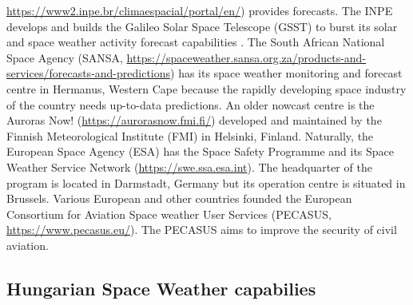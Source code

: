 \documentclass[sn-aps]{sn-jnl}%
\begin{document}
\url{https://www2.inpe.br/climaespacial/portal/en/}) provides forecasts. The INPE develops and builds the Galileo Solar Space Telescope (GSST) to burst its solar and space weather activity forecast capabilities \cite{pesquisas18:_galil_solar_space_teles_mission_study_repor}. The South African National Space Agency (SANSA, \url{https://spaceweather.sansa.org.za/products-and-services/forecasts-and-predictions}) has its space weather monitoring and forecast centre in Hermanus, Western Cape because the rapidly developing space industry of the country needs up-to-data predictions. An older nowcast centre is the Auroras Now! (\url{https://aurorasnow.fmi.fi/}) developed and maintained by the Finnish Meteorological Institute (FMI) in Helsinki, Finland. Naturally, the European Space Agency (ESA) has the Space Safety Programme and its Space Weather Service Network (\url{https://swe.ssa.esa.int}). The headquarter of the program is located in Darmstadt, Germany but its operation centre is situated in Brussels. Various European and other countries founded the European Consortium for Aviation Space weather User Services (PECASUS, \url{https://www.pecasus.eu/}). The PECASUS aims to improve the security of civil aviation.  


\subsection{Hungarian Space Weather capabilies}
\label{sec:hunswcap}
\end{document}
